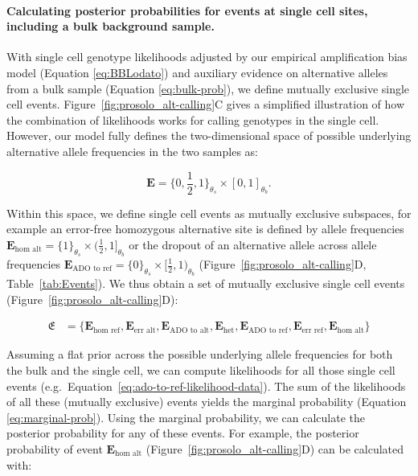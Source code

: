 \documentclass[12pt,inline]{wlscirep}
\begin{document}
\paragraph{Calculating posterior probabilities for events at single cell sites, including a bulk background sample.}
With single cell genotype likelihoods adjusted by our empirical amplification bias model (Equation \ref{eq:BBLodato}) and auxiliary evidence on alternative alleles from a bulk sample (Equation \ref{eq:bulk-prob}), we define mutually exclusive single cell events.
Figure~\ref{fig:prosolo_alt-calling}C gives a simplified illustration of how the combination of likelihoods works for calling genotypes in the single cell.
However, our model fully defines the two-dimensional space of possible underlying alternative allele frequencies in the two samples as:

\begin{equation}
  \label{eq:event-space}
  \boldsymbol{E} =\{0, \frac{1}{2}, 1\}_{\theta_s} \times [0, 1]_{\theta_b}.
\end{equation}

Within this space, we define single cell events as mutually exclusive subspaces, for example an error-free homozygous alternative site is defined by allele frequencies $\boldsymbol{E}_{\text{hom alt}} = \{ 1 \}_{\theta_s} \times (\frac{1}{2}, 1]_{\theta_b}$  or the dropout of an alternative allele across allele frequencies $\boldsymbol{E}_{\text{ADO to ref}} = \{ 0 \}_{\theta_s} \times [\frac{1}{2}, 1)_{\theta_b}$ (Figure~\ref{fig:prosolo_alt-calling}D, Table~\ref{tab:Events}).
We thus obtain a set of mutually exclusive single cell events (Figure~\ref{fig:prosolo_alt-calling}D):

\begin{equation}
  \label{eq:event-set}
  \begin{split}
    \mathfrak{E} &= \{ \boldsymbol{E}_{\text{hom ref}}, \boldsymbol{E}_{\text{err alt}}, \boldsymbol{E}_{\text{ADO to alt}}, \boldsymbol{E}_{\text{het}}, \boldsymbol{E}_{\text{ADO to ref}}, \boldsymbol{E}_{\text{err ref}}, \boldsymbol{E}_{\text{hom alt}} \}
  \end{split}
\end{equation}

Assuming a flat prior across the possible underlying allele frequencies for both the bulk and the single cell, we can compute likelihoods for all those single cell events (e.g.~Equation~\ref{eq:ado-to-ref-likelihood-data}).
The sum of the likelihoods of all these (mutually exclusive) events yields the marginal probability (Equation \ref{eq:marginal-prob}).
Using the marginal probability, we can calculate the posterior probability for any of these events.
For example, the posterior probability of event $\boldsymbol{E}_{\text{hom alt}}$ (Figure~\ref{fig:prosolo_alt-calling}D) can be calculated with:
\end{document}

